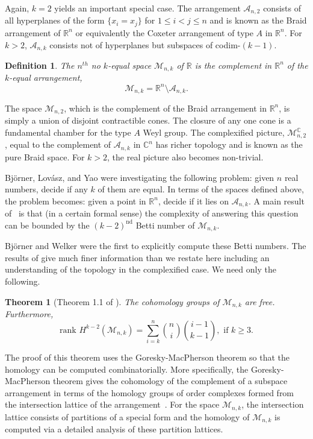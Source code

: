\documentclass{amsart}
\newcommand{\R}{{\mathbb R}}
\newcommand{\M}{{\mathcal M}_{n, k}}
\newtheorem{theorem}{Theorem}[section]
\newtheorem{defin}{Definition}
\begin{document}
Again, $k=2$ yields an important special case.  The arrangement
$\mathcal{A}_{n,2}$ consists of all {hyperplanes} of the form $\{x_i = x_j\}$
for $ 1 \leq i < j \leq n$ and is known as the {Braid}
arrangement of $\R^n$ or equivalently the Coxeter arrangement of type
$A$ in $\R^n$.  For $k>2$, $\mathcal{A}_{n,k}$ consists not of hyperplanes but subspaces of codim-$(k-1)$.  


\begin{defin}
The \emph{$n^{th}$ no $k$-equal space} $\M$ of $\R$ is the complement
in $\R^n$ of the $k$-equal arrangement, $$\M = \R^n \setminus \mathcal{A}_{n,k}.$$
\end{defin}

The space $\mathcal{M}_{n,2}$, which is the complement of the Braid
arrangement in $\R^n$, is simply a union of disjoint contractible cones.  The
closure of any one cone is a fundamental chamber for the type $A$ Weyl
group.  The complexified picture, $\mathcal{M}^{\mathbb{C}}_{n,2}$,
equal to the complement of $\mathcal{A}_{n,k}$ in $\mathbb{C}^n$ has
richer topology and is known as the pure Braid space.  For $k >2$, the
real picture also becomes non-trivial.


Bj\"{o}rner, Lov\'{a}sz, and Yao
 were investigating the following problem:
given $n$ real numbers, decide if any $k$ of them are equal.  In terms
of the spaces defined above, the problem becomes: given a point in
$\R^n$, decide if it lies on $\mathcal{A}_{n,k}$.  A main result of~\cite{BLY}
is that (in a certain formal sense) the complexity of answering this
question can be bounded by the $(k-2)^{\textrm{nd}}$ Betti number of $\M$.

Bj\"{o}rner and Welker were the first to explicitly compute these Betti numbers.  The results of \cite{BW} 
give much finer information than we restate here including an understanding of the topology in the complexified case.  We need only the following.  
\begin{theorem}[Theorem 1.1 of \cite{BW}]
The cohomology groups of $\mathcal{M}_{n,k}$ are free.  Furthermore, 
$$\textrm{rank } H^{k-2}(\mathcal{M}_{n,k}) = \sum_{i=k}^n { n \choose
  i} { i-1 \choose k-1}, \textrm{ if } k \geq 3.$$
\end{theorem}


The proof of this theorem uses the Goresky-MacPherson theorem so that
the homology can be computed combinatorially.  More specifically, the
Goresky-MacPherson theorem gives the cohomology of the complement of a
subspace arrangement in terms of the homology groups of order complexes
formed from the intersection lattice of the arrangement~\cite{GM}.   For the
space $\M$, the intersection lattice consists of partitions of a
special form and the homology of $\M$ is computed via a detailed
analysis of these partition lattices.
\end{document}
